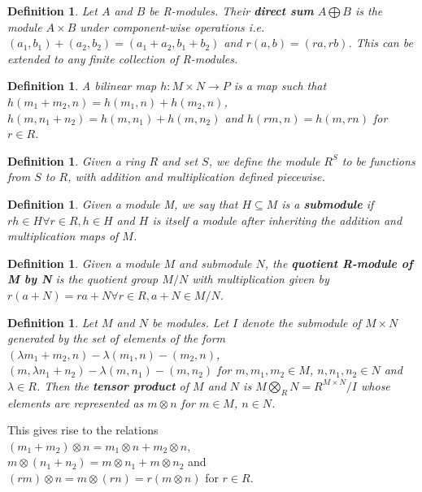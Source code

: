 \documentclass{article}
\newtheorem{definition}[theorem]{Definition}
\begin{document}
\begin{definition}
Let $A$ and $B$ be R-modules. Their \textbf{direct sum} $A\bigoplus B$ is the module $A\times B$ under component-wise operations i.e. $(a_1,b_1)+(a_2,b_2)=(a_1+a_2,b_1+b_2)$ and $r(a,b)=(ra,rb)$. This can be extended to any finite collection of R-modules.
\end{definition}

\begin{definition}
A bilinear map $h\colon M\times N\to P$ is a map such that $h(m_1+m_2,n)=h(m_1,n)+h(m_2,n)$, $h(m,n_1+n_2)=h(m,n_1)+h(m,n_2)$ and $h(rm,n)=h(m,rn)$ for $r\in R$.
\end{definition}

\begin{definition}
Given a ring $R$ and set $S$, we define the module $R^S$ to be functions from $S$ to $R$, with addition and multiplication defined piecewise.
\end{definition}


\begin{definition}
Given a module M, we say that $H\subseteq M$ is a \textbf{submodule} if $rh\in H\forall r\in R,h\in H$ and $H$ is itself a module after inheriting the addition and multiplication maps of $M$.
\end{definition}

\begin{definition}
Given a module $M$ and submodule $N$, the \textbf{quotient R-module of M by N} is the quotient group $M/N$ with multiplication given by $r(a+N)=ra+N\forall r\in R,a+N\in M/N$.
\end{definition}

\begin{definition}
Let $M$ and $N$ be modules. Let $I$ denote the submodule of $M\times N$ generated by the set of elements of the form $(\lambda m_1+m_2,n)-\lambda(m_1,n)-(m_2,n)$, $(m,\lambda n_1+n_2)-\lambda(m,n_1)-(m,n_2)$ for $m,m_1,m_2\in M$, $n,n_1,n_2\in N$ and $\lambda\in R$. Then the \textbf{tensor product} of $M$ and $N$ is $M\bigotimes_R N=R^{M\times N}/I$ whose elements are represented as $m\otimes n$ for $m\in M$, $n\in N$.
\end{definition}

\noindent This gives rise to the relations\\ $(m_1+m_2)\otimes n=m_1\otimes n+m_2\otimes n$,\\
$m\otimes(n_1+n_2)=m\otimes n_1+m\otimes n_2$ and\\
$(rm)\otimes n=m\otimes (rn)=r(m\otimes n)$ for $r\in R$.
\end{document}
